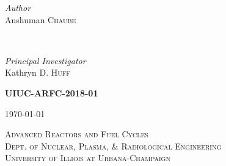 \documentclass[14pt,a4paper]{article} %
\begin{document}
\begin{titlepage}
    \begin{minipage}{0.4\textwidth}
        \begin{flushleft}
            \large
            \textit{Author}\\
            Anshuman \textsc{Chaube}\\
        \end{flushleft}
    \end{minipage}
    ~
    \begin{minipage}{0.4\textwidth}
        \begin{flushright}
            \large
            \textit{Principal Investigator}\\
            Kathryn D. \textsc{Huff} %
        \end{flushright}
    \end{minipage}
    

    \vspace{1cm}
    \textsc{\LARGE\bfseries UIUC-ARFC-2018-01} %
    \vspace{0.5cm}
    
    
    \vspace{0.5cm} %
    {\large\today} %
    \vspace{0.5cm}

    
    \textsc{\LARGE Advanced Reactors and Fuel Cycles}\\[0.25cm] %
    
    \textsc{\large Dept. of Nuclear, Plasma, \& Radiological Engineering}\\%
    
    \textsc{\large University of Illiois at Urbana-Champaign}\\ %



\end{titlepage}
\end{document}
